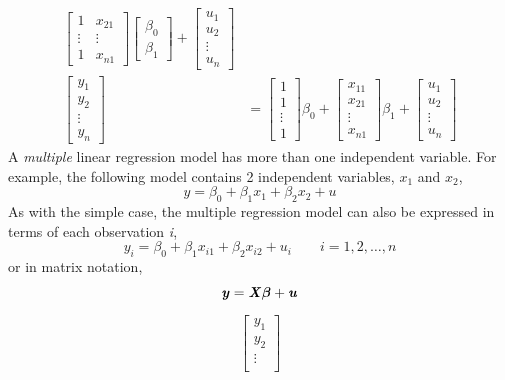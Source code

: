 \documentclass[12pt]{report}
\newenvironment{blueframed}[1][blue]
{\def\FrameCommand{\fboxsep=\FrameSep\fcolorbox{#1}{white}}%
\MakeFramed {\advance\hsize-\width \FrameRestore}}
{\endMakeFramed}
\begin{document}
\begin{blueframed}
{\begin{align*}
\begin{bmatrix}
	1 & x_{21} \\
	\vdots & \vdots \\
	1 & x_{n1}  
	\end{bmatrix}
	\begin{bmatrix}
	\beta_0 \\
	\beta_1
	\end{bmatrix}
	+
	\begin{bmatrix}
	u_{1} \\
	u_{2} \\
	\vdots \\
	u_{n} 
	\end{bmatrix} \\
	\begin{bmatrix}
	y_{1} \\
	y_{2} \\
	\vdots \\
	y_{n} 
	\end{bmatrix}
	&= 
	\begin{bmatrix}
	1 \\
	1 \\
	\vdots \\
	1   
	\end{bmatrix}
	\beta_0
	+
	\begin{bmatrix}
	x_{11} \\
	x_{21} \\
	\vdots \\
	x_{n1}   
	\end{bmatrix}
	\beta_1
	+
	\begin{bmatrix}
	u_{1} \\
	u_{2} \\
	\vdots \\
	u_{n} 
	\end{bmatrix}
	\end{align*}
	A \textit{multiple} linear regression model has more than one independent variable. For example, the following model contains 2 independent variables, $x_1$ and $x_2$,
	$$y = \beta_0+\beta_1x_{1}+\beta_2x_{2}+u$$
	As with the simple case, the multiple regression model can also be expressed in terms of each observation \textit{i},
	$$y_i = \beta_0+\beta_1x_{i1}+\beta_2x_{i2}+u_i \qquad i=1,2,\dots,n$$
	or in matrix notation,
	$$\textbf{\textit{y}}=\textbf{\textit{X}}\boldsymbol{\beta}+\textbf{\textit{u}}$$
	\begin{align*}
	\begin{bmatrix}
	y_{1} \\
	y_{2} \\
	\vdots \\

\end{bmatrix}
\end{align*}}
\end{blueframed}
\end{document}
